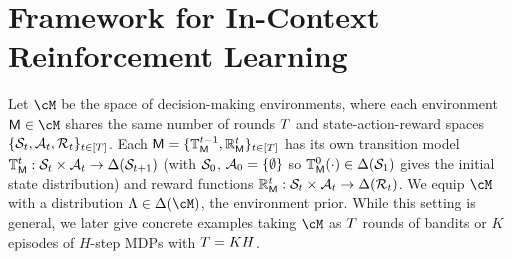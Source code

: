 \section{Framework for In-Context Reinforcement Learning}\label{sec:framework}




Let $\cM$ be the space of decision-making environments, where each environment $\inst \in \cM$ shares the same number of rounds ${T}$ and state-action-reward spaces $\{ {\mathcal{S}}_t,  {\mathcal{A}}_t, {\mathcal{R}}_t \}_{t \in [{T}]}$. Each ${\mathsf{M}} = \{{\mathbb T}_{\mathsf{M}}^{t-1}, {\mathbb R}_{\mathsf{M}}^t \}_{t \in [{T}]}$ has its own transition model ${\mathbb T}_{\mathsf{M}}^t: {\mathcal{S}}_{t} \times {\mathcal{A}}_{t} \to \Delta({\mathcal{S}}_{t+1})$ (with ${\mathcal{S}}_0$, ${\mathcal{A}}_0 = \{ \emptyset \}$ so ${\mathbb T}_{\mathsf{M}}^0(\cdot) \in \Delta({\mathcal{S}}_1)$ gives the initial state distribution) and reward functions ${\mathbb R}_{\mathsf{M}}^{t}: {\mathcal{S}}_{t} \times {\mathcal{A}}_{t} \to \Delta({\mathcal{R}}_t)$. We equip $\cM$ with a distribution $\prior \in \Delta(\cM)$, the environment prior. While this setting is general, we later give concrete examples taking $\cM$ as ${T}$ rounds of bandits or $K$ episodes of $H$-step MDPs with ${T} = K H$. 

